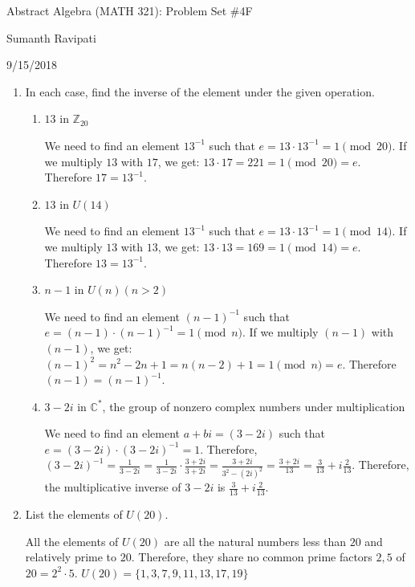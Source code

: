 \documentclass{article}
\newcommand{\IC}{\mathbb{C}}
\newcommand{\IZ}{\mathbb{Z}}
\begin{document}
%
\centerline{\Large Abstract Algebra (MATH 321): Problem Set \#4F}
\centerline{Sumanth Ravipati}
\centerline{9/15/2018}
\vspace{.25in}

\begin{enumerate}
\item In each case, find the inverse of the element under the given operation.
    \begin{enumerate}
        \item $13$ in $\IZ_{20}$
        \begin{flushleft}
        We need to find an element $13^{-1}$ such that $e = 13 \cdot 13^{-1} = 1\pmod{20}$. If we multiply $13$ with $17$, we get: $13 \cdot 17 = 221 = 1\pmod{20} = e$. Therefore $17 = 13^{-1}$.
        \end{flushleft}
        \item $13$ in $U(14)$
        \begin{flushleft}
        We need to find an element $13^{-1}$ such that $e = 13 \cdot 13^{-1} = 1\pmod{14}$. If we multiply $13$ with $13$, we get: $13 \cdot 13 = 169 = 1 \pmod{14} = e$. Therefore $13 = 13^{-1}$.
        \end{flushleft}
        \item $n-1$ in $U(n) (n > 2)$
        \begin{flushleft}
        We need to find an element $(n-1)^{-1}$ such that $e = (n-1) \cdot (n-1)^{-1} = 1\pmod{n}$. If we multiply $(n-1)$ with $(n-1)$, we get: $(n-1)^2 = n^2 - 2n + 1 = n(n-2) + 1 = 1\pmod{n} = e$. Therefore $(n-1) = (n-1)^{-1}$.
        \end{flushleft}
        \item $3 - 2i$ in $\IC^*$, the group of nonzero complex numbers under multiplication
        \begin{flushleft}
        We need to find an element $a + bi = (3 - 2i)$ such that $e = (3 - 2i) \cdot (3 - 2i)^{-1} = 1$. Therefore, $(3 - 2i)^{-1} = \frac{1}{3 - 2i} = \frac{1}{3 - 2i} \cdot \frac{3 + 2i}{3 + 2i} = \frac{3 + 2i}{3^2 - (2i)^2} = \frac{3 + 2i}{13} = \frac{3}{13} + i\frac{2}{13}$. Therefore, the multiplicative inverse of $3 - 2i$ is $\frac{3}{13} + i\frac{2}{13}$.
        \end{flushleft}
    \end{enumerate}

\item List the elements of $U(20)$.
\begin{flushleft}
All the elements of $U(20)$ are all the natural numbers less than $20$ and relatively prime to $20$. Therefore, they share no common prime factors $2, 5$ of $20 = 2^2\cdot5$. $U(20) = \{1, 3, 7, 9, 11, 13, 17, 19\}$
\end{flushleft}


\end{enumerate}
\end{document}

